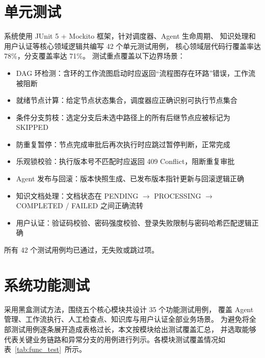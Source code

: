 \section{单元测试}

系统使用 JUnit 5 + Mockito 框架，针对调度器、Agent 生命周期、
知识处理和用户认证等核心领域逻辑共编写 42 个单元测试用例，
核心领域层代码行覆盖率达 78\%，分支覆盖率达 71\%。
测试重点覆盖以下边界场景：

\begin{itemize}
  \item DAG 环检测：含环的工作流图启动时应返回“流程图存在环路”错误，工作流被阻断
  \item 就绪节点计算：给定节点状态集合，调度器应正确识别可执行节点集合
  \item 条件分支剪枝：选定分支后未选中路径上的所有后继节点应被标记为 SKIPPED
  \item 防重复暂停：节点完成审批后再次执行时应跳过暂停判断，正常完成
  \item 乐观锁校验：执行版本号不匹配时应返回 409 Conflict，阻断重复审批
  \item Agent 发布与回滚：版本快照生成、已发布版本指针更新与回滚逻辑正确
  \item 知识文档处理：文档状态在 PENDING $\rightarrow$ PROCESSING $\rightarrow$ COMPLETED / FAILED 之间正确流转
  \item 用户认证：验证码校验、密码强度校验、登录失败限制与密码哈希匹配逻辑正确
\end{itemize}

所有 42 个测试用例均已通过，无失败或跳过项。

\section{系统功能测试}

采用黑盒测试方法，围绕五个核心模块共设计 35 个功能测试用例，
覆盖 Agent 管理、工作流执行、人工检查点、知识库与用户认证全部业务场景。
为避免将全部测试用例逐条展开造成表格过长，本文按模块给出测试覆盖汇总，
并选取能够代表关键业务链路和异常分支的用例进行列示。各模块测试覆盖情况如表~\ref{tab:func_test}~所示。

